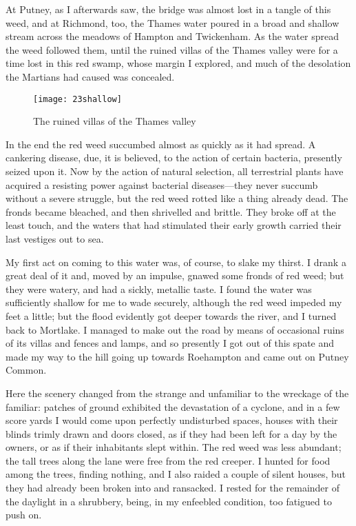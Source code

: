 At Putney, as I afterwards saw, the bridge was almost lost in a tangle of this weed, and at Richmond, too, the Thames water poured in a broad and shallow stream across the meadows of Hampton and Twickenham. As the water spread the weed followed them, until the ruined villas of the Thames valley were for a time lost in this red swamp, whose margin I explored, and much of the desolation the Martians had caused was concealed.

\begin{figure}[tbp]
\centering
\texttt{[image: 23shallow]}
\caption{The ruined villas of the Thames valley}
\end{figure}

In the end the red weed succumbed almost as quickly as it had spread. A cankering disease, due, it is believed, to the action of certain bacteria, presently seized upon it. Now by the action of natural selection, all terrestrial plants have acquired a resisting power against bacterial diseases—they never succumb without a severe struggle, but the red weed rotted like a thing already dead. The fronds became bleached, and then shrivelled and brittle. They broke off at the least touch, and the waters that had stimulated their early growth carried their last vestiges out to sea.

My first act on coming to this water was, of course, to slake my thirst. I drank a great deal of it and, moved by an impulse, gnawed some fronds of red weed; but they were watery, and had a sickly, metallic taste. I found the water was sufficiently shallow for me to wade securely, although the red weed impeded my feet a little; but the flood evidently got deeper towards the river, and I turned back to Mortlake. I managed to make out the road by means of occasional ruins of its villas and fences and lamps, and so presently I got out of this spate and made my way to the hill going up towards Roehampton and came out on Putney Common.



Here the scenery changed from the strange and unfamiliar to the wreckage of the familiar: patches of ground exhibited the devastation of a cyclone, and in a few score yards I would come upon perfectly undisturbed spaces, houses with their blinds trimly drawn and doors closed, as if they had been left for a day by the owners, or as if their inhabitants slept within. The red weed was less abundant; the tall trees along the lane were free from the red creeper. I hunted for food among the trees, finding nothing, and I also raided a couple of silent houses, but they had already been broken into and ransacked. I rested for the remainder of the daylight in a shrubbery, being, in my enfeebled condition, too fatigued to push on.

